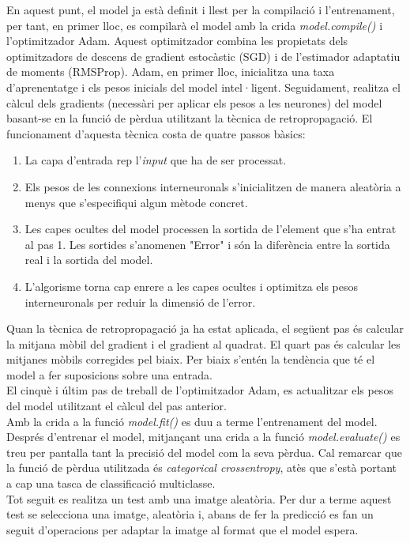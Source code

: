 \documentclass[a4paper,12pt]{report}
\begin{document}
En aquest punt, el model ja està definit i llest per la compilació i l'entrenament, per tant, en primer lloc, es compilarà el model amb la crida \textit{model.compile()} i l'optimitzador Adam. Aquest optimitzador combina les propietats dels optimitzadors de descens de gradient estocàstic (SGD) i de l'estimador adaptatiu de moments (RMSProp). Adam, en primer lloc, inicialitza una taxa d'aprenentatge i els pesos inicials del model intel·ligent. Seguidament, realitza el càlcul dels gradients (necessàri per aplicar els pesos a les neurones) del model basant-se en la funció de pèrdua utilitzant la tècnica de retropropagació. El funcionament d'aquesta tècnica costa de quatre passos bàsics:
\begin{enumerate}
    \item La capa d'entrada rep l'\textit{input} que ha de ser processat.
    \item Els pesos de les connexions interneuronals s'inicialitzen de manera aleatòria a menys que s'especifiqui algun mètode concret.
    \item Les capes ocultes del model processen la sortida de l'element que s'ha entrat al pas 1. Les sortides s'anomenen "Error" i són la diferència entre la sortida real i la sortida del model.
    \item L'algorisme torna cap enrere a les capes ocultes i optimitza els pesos interneuronals per reduir la dimensió de l'error.
\end{enumerate}
Quan la tècnica de retropropagació ja ha estat aplicada, el següent pas és calcular la mitjana mòbil del gradient i el gradient al quadrat. El quart pas és calcular les mitjanes mòbils corregides pel biaix. Per biaix s'entén la tendència que té el model a fer suposicions sobre una entrada.\\
El cinquè i últim pas de treball de l'optimitzador Adam, es actualitzar els pesos del model utilitzant el càlcul del pas anterior.\\
Amb la crida a la funció \textit{model.fit()} es duu a terme l'entrenament del model.\\
Després d'entrenar el model, mitjançant una crida a la funció \textit{model.evaluate()} es treu per pantalla tant la precisió del model com la seva pèrdua. Cal remarcar que la funció de pèrdua utilitzada és \textit{categorical crossentropy}, atès que s'està portant a cap una tasca de classificació multiclasse.\\
Tot seguit es realitza un test amb una imatge aleatòria. Per dur a terme aquest test se selecciona una imatge, aleatòria i, abans de fer la predicció es fan un seguit d'operacions per adaptar la imatge al format que el model espera.
\end{document}
